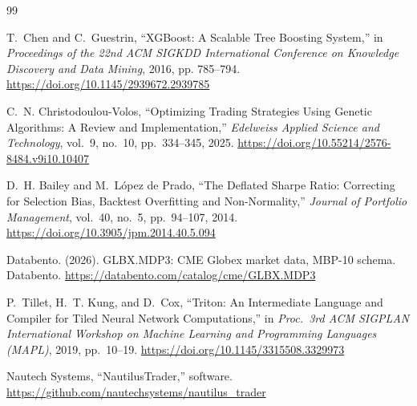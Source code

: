 \documentclass[11pt,letterpaper]{article}
\begin{document}
\begin{thebibliography}{99}
\small\setlength{\itemsep}{1pt}

T.~Chen and C.~Guestrin,
``XGBoost: A Scalable Tree Boosting System,''
in \textit{Proceedings of the 22nd ACM SIGKDD International Conference on Knowledge Discovery and Data Mining}, 2016, pp. 785--794.
\url{https://doi.org/10.1145/2939672.2939785}

C.~N. Christodoulou-Volos,
``Optimizing Trading Strategies Using Genetic Algorithms: A Review and Implementation,''
\textit{Edelweiss Applied Science and Technology}, vol.~9, no.~10, pp.~334--345, 2025.
\url{https://doi.org/10.55214/2576-8484.v9i10.10407}

D.~H. Bailey and M.~L\'opez de Prado,
``The Deflated Sharpe Ratio: Correcting for Selection Bias, Backtest Overfitting and Non-Normality,''
\textit{Journal of Portfolio Management}, vol.~40, no.~5, pp.~94--107, 2014.
\url{https://doi.org/10.3905/jpm.2014.40.5.094}

Databento. (2026). GLBX.MDP3: CME Globex market data, MBP-10 schema. Databento.
\url{https://databento.com/catalog/cme/GLBX.MDP3}

P.~Tillet, H.~T. Kung, and D.~Cox,
``Triton: An Intermediate Language and Compiler for Tiled Neural Network Computations,''
in \textit{Proc.\ 3rd ACM SIGPLAN International Workshop on Machine Learning and Programming Languages (MAPL)}, 2019, pp.~10--19.
\url{https://doi.org/10.1145/3315508.3329973}

Nautech Systems, ``NautilusTrader,'' software.
\url{https://github.com/nautechsystems/nautilus_trader}

\end{thebibliography}
 
\end{document}

